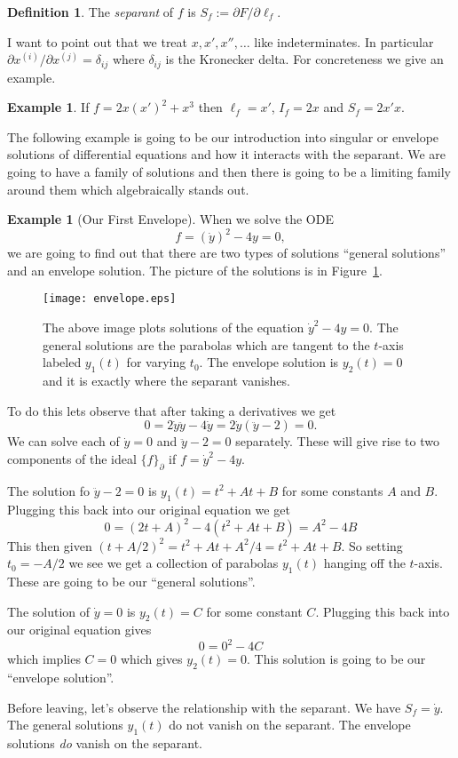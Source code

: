 \documentclass[12pt]{book}
\numberwithin{equation}{section}
\theoremstyle{definition}
\newtheorem{definition}[theorem]{Definition}
\newtheorem{example}[theorem]{Example}
\theoremstyle{remark}
\begin{document}
\begin{definition}
	The \emph{separant} of $f$ is $S_f:=\partial F/\partial \ell_f$. 
\end{definition}

I want to point out that we treat $x,x',x'',\ldots$ like indeterminates. 
In particular $\partial x^{(i)}/\partial x^{(j)} = \delta_{ij}$ where $\delta_{ij}$ is the Kronecker delta. 
For concreteness we give an example.
\begin{example}
	If $f = 2x(x')^2 + x^3$ then $\ell_f = x'$, $I_f = 2x$ and $S_f = 2x'x$. 
\end{example}

The following example is going to be our introduction into singular or envelope solutions of differential equations and how it interacts with the separant.
We are going to have a family of solutions and then there is going to be a limiting family around them which algebraically stands out.
\begin{example}[Our First Envelope]
	When we solve the ODE
	 $$ f=(\dot{y})^2 - 4y =0,$$
	we are going to find out that there are two types of solutions ``general solutions'' and an envelope solution. 
	The picture of the solutions is in Figure~\ref{F:envelope}.
	\begin{figure}[]
		\begin{center}
			\texttt{[image: envelope.eps]}
		\end{center}
	\caption{The above image plots solutions of the equation $\dot{y}^2-4y=0$.
		The general solutions are the parabolas which are tangent to the $t$-axis labeled $y_1(t)$ for varying $t_0$. 
		The envelope solution is $y_2(t)=0$ and it is exactly where the separant vanishes.	
}\label{F:envelope}
	\end{figure}
	 
	To do this lets observe that after taking a derivatives we get 
	$$0=2\dot{y}\ddot{y}-4\dot{y} = 2\dot{y}(\ddot{y}-2)=0.$$
	We can solve each of $\dot{y}=0$ and $\ddot{y}-2=0$ separately. 
	These will give rise to two components of the ideal $\lbrace f \rbrace_{\partial}$ if $f = \dot{y}^2-4y$. 
	
	The solution fo $\ddot{y}-2=0$ is $y_1(t) = t^2 + At + B$ for some constants $A$ and $B$.
	Plugging this back into our original equation we get 
	$$0=(2t+A)^2 -4(t^2+At+B)=A^2-4B$$
	This then given $(t+A/2)^2=t^2+At +A^2/4=t^2+At+B$.
	So setting $t_0=-A/2$ we see we get a collection of parabolas $y_1(t)$ hanging off the $t$-axis.
	These are going to be our ``general solutions''.
	
	The solution of $\dot{y}=0$ is $y_2(t)=C$ for some constant $C$. 
	Plugging this back into our original equation gives 
	$$ 0=0^2-4C$$
	which implies $C=0$ which gives $y_2(t)=0$. 
	This solution is going to be our ``envelope solution''.
	
	Before leaving, let's observe the relationship with the separant. 
	We have $S_f = \dot{y}$.
	The general solutions $y_1(t)$ do not vanish on the separant. 
	The envelope solutions \emph{do} vanish on the separant.
\end{example}
\end{document}
